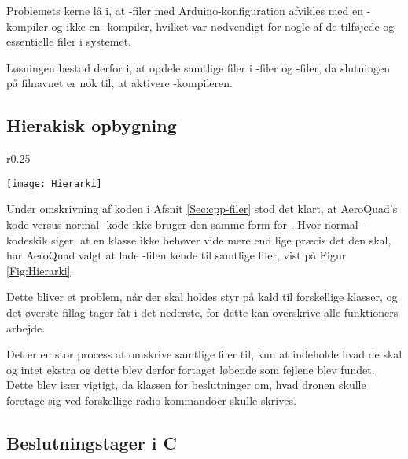 \documentclass[Main]{subfiles}
\begin{document}
Problemets kerne lå i, at -filer med Arduino-konfiguration afvikles med en -kompiler og ikke en -kompiler, hvilket var nødvendigt for nogle af de tilføjede og essentielle filer i systemet.

Løsningen bestod derfor i, at opdele samtlige filer i -filer og -filer, da slutningen på filnavnet er nok til, at aktivere -kompileren.



\subsection{Hierakisk opbygning}

\begin{wrapfigure}{r}{0.25\textwidth}
  \vspace{-20pt}
  \begin{center}
	\texttt{[image: Hierarki]}
  \end{center}
  \vspace{-20pt}
  \caption{AeroQuad's opbygning.}
  \label{Fig:Hierarki}
  \vspace{-20pt}
\end{wrapfigure}

Under omskrivning af koden i Afsnit \ref{Sec:cpp-filer} stod det klart, at Aero\-Quad's kode versus normal -kode ikke bruger den samme form for .
Hvor normal -kodeskik siger, at en klasse ikke behøver vide mere end lige præcis det den skal, har AeroQuad valgt at lade -filen kende til samtlige filer, vist på Figur \ref{Fig:Hierarki}.

Dette bliver et problem, når der skal holdes styr på kald til forskellige klasser, og det øverste fillag tager fat i det nederste, for dette kan overskrive alle funktioners arbejde.

Det er en stor process at omskrive samtlige filer til, kun at indeholde hvad de skal og intet ekstra og dette blev derfor fortaget løbende som fejlene blev fundet.
Dette blev især vigtigt, da klassen for beslutninger om, hvad dronen skulle foretage sig ved forskellige radio-kommandoer skulle skrives.



\newpage
\subsection{Beslutningstager i C}
\end{document}
